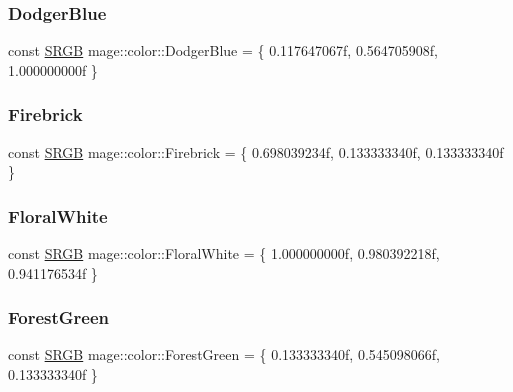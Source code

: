 \subsubsection{\texorpdfstring{Dodger\+Blue}{DodgerBlue}}
{\footnotesize\ttfamily const \hyperlink{structmage_1_1_s_r_g_b}{S\+R\+GB} mage\+::color\+::\+Dodger\+Blue = \{ 0.\+117647067f, 0.\+564705908f, 1.\+000000000f \}}

\hypertarget{namespacemage_1_1color_a4d557745807e6fea222312724352dfcb}{}\label{namespacemage_1_1color_a4d557745807e6fea222312724352dfcb} 
\subsubsection{\texorpdfstring{Firebrick}{Firebrick}}
{\footnotesize\ttfamily const \hyperlink{structmage_1_1_s_r_g_b}{S\+R\+GB} mage\+::color\+::\+Firebrick = \{ 0.\+698039234f, 0.\+133333340f, 0.\+133333340f \}}

\hypertarget{namespacemage_1_1color_abec765244c78f5d10b9fbdea111be1f8}{}\label{namespacemage_1_1color_abec765244c78f5d10b9fbdea111be1f8} 
\subsubsection{\texorpdfstring{Floral\+White}{FloralWhite}}
{\footnotesize\ttfamily const \hyperlink{structmage_1_1_s_r_g_b}{S\+R\+GB} mage\+::color\+::\+Floral\+White = \{ 1.\+000000000f, 0.\+980392218f, 0.\+941176534f \}}

\hypertarget{namespacemage_1_1color_a3ebf27996eb559ee5bf941ee6f77a2a0}{}\label{namespacemage_1_1color_a3ebf27996eb559ee5bf941ee6f77a2a0} 
\subsubsection{\texorpdfstring{Forest\+Green}{ForestGreen}}
{\footnotesize\ttfamily const \hyperlink{structmage_1_1_s_r_g_b}{S\+R\+GB} mage\+::color\+::\+Forest\+Green = \{ 0.\+133333340f, 0.\+545098066f, 0.\+133333340f \}}

\hypertarget{namespacemage_1_1color_a5cb845630f908c0e50b9ab831fe9ab92}{}\label{namespacemage_1_1color_a5cb845630f908c0e50b9ab831fe9ab92} 
